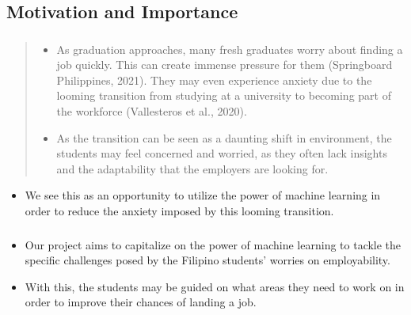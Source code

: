 \subsection{Motivation and Importance}
\begin{frame}
\frametitle{\subsecname}
	\begin{quote}
		\begin{itemize}
			\item As graduation approaches, many fresh graduates worry about finding a job quickly. This can create immense pressure for them (Springboard Philippines, 2021). They may even experience anxiety due to the looming transition from studying at a university to becoming part of the workforce (Vallesteros et al., 2020).
			\item As the transition can be seen as a daunting shift in environment, the students may feel concerned and worried, as they often lack insights and the adaptability that the employers are looking for.
		\end{itemize}
	\end{quote}
	\begin{itemize}
		\item We see this as an opportunity to utilize the power of machine learning in order to reduce the anxiety imposed by this looming transition.
	\end{itemize}
\end{frame}

\begin{frame}
\frametitle{\subsecname}
	\begin{itemize}
		\item Our project aims to capitalize on the power of machine learning to tackle the specific challenges posed by the Filipino students’ worries on employability.
		\item With this, the students may be guided on what areas they need to work on in order to improve their chances of landing a job.
	\end{itemize}
\end{frame}
